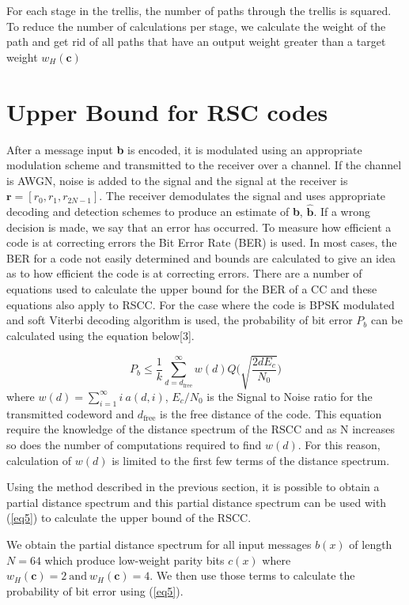 \documentclass[conference]{IEEEtran}
\begin{document}
  For each stage in the trellis, the number of paths through the trellis is squared. To reduce the number of calculations per stage, we calculate the weight of the path and get rid of all paths that have an output weight greater than a target weight $w_H(\textbf{c})$
 
\section{Upper Bound for RSC codes}
\label{sec4}
After a message input \textbf{b} is encoded, it is modulated using an appropriate modulation scheme and transmitted to the receiver over a channel. If the channel is AWGN, noise is added to the signal and the signal at the receiver is $\textbf{r}=[r_0,r_1,r_{2N-1}]$. The receiver demodulates the signal and uses appropriate decoding and detection schemes to produce an estimate of \textbf{b}, $\hat{ \textbf{b} }$. If a wrong decision is made, we say that an error has occurred. To measure how efficient a code is at correcting errors the Bit Error Rate (BER) is used. In most cases, the BER for a code not easily determined and bounds are calculated to give an idea as to how efficient the code is at correcting errors. There are a number of equations used to calculate the upper bound for the BER of a CC and these equations also apply to RSCC. For the case where the code is BPSK modulated and soft Viterbi decoding algorithm is used, the probability of bit error $P_b$ can be calculated using the equation below[3].

\begin{equation}
P_b \leq \frac{1}{k} \sum_{d=d_{\text{free}}}^{\infty} w(d) Q\Bigg( \sqrt{\frac{2dE_c}{N_0}}\Bigg)
\label{eq5}
\end{equation}
where $w(d)=\sum_{i=1}^{\infty} i~ a(d,i)$, $E_c/N_0$ is the Signal to Noise ratio for the transmitted codeword and $d_{\text{free}}$ is the free distance of the code. This equation require the knowledge of the distance spectrum of the RSCC and as N increases so does the number of computations required to find $w(d)$. For this reason, calculation of $w(d)$ is limited to the first few terms of the distance spectrum. 

Using the method described in the previous section, it is possible to obtain a partial distance spectrum and this partial distance spectrum can be used with (\ref{eq5}) to calculate the upper bound of the RSCC. 

We obtain the partial distance spectrum for all input messages $b(x)$ of length $N=64$ which produce low-weight parity bits
$c(x)$ where $w_H(\textbf{c})=2 ~\text{and} ~ w_H(\textbf{c})=4$. We then use those terms to calculate the probability of bit error using (\ref{eq5}). 
\end{document}

